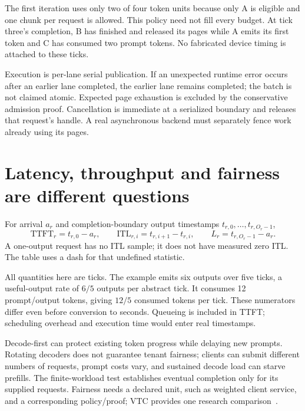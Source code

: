 \begin{center}\end{center}

The first iteration uses only two of four token units because only A is
eligible and one chunk per request is allowed. This policy need not fill
every budget. At tick three's completion, B has finished and released its
pages while A emits its first token and C has consumed two prompt tokens.
No fabricated device timing is attached to these ticks.


Execution is per-lane serial publication. If an unexpected runtime error
occurs after an earlier lane completed, the earlier lane remains completed;
the batch is not claimed atomic. Expected page exhaustion is excluded by
the conservative admission proof. Cancellation is immediate at a serialized
boundary and releases that request's handle. A real asynchronous backend
must separately fence work already using its pages.

\section{Latency, throughput and fairness are different questions}
\label{evod37:metrics}
For arrival $a_r$ and completion-boundary output timestamps
$t_{r,0},\ldots,t_{r,O_r-1}$,
\[
 \mathrm{TTFT}_r=t_{r,0}-a_r,\qquad
 \mathrm{ITL}_{r,i}=t_{r,i+1}-t_{r,i},\qquad
 L_r=t_{r,O_r-1}-a_r.
\]
A one-output request has no ITL sample; it does not have measured zero ITL.
The table uses a dash for that undefined statistic.
\begin{center}\end{center}

All quantities here are ticks. The example emits six outputs over five
ticks, a useful-output rate of $6/5$ outputs per abstract tick. It consumes
12 prompt/output tokens, giving $12/5$ consumed tokens per tick. These
numerators differ even before conversion to seconds. Queueing is included
in TTFT; scheduling overhead and execution time would enter real timestamps.

Decode-first can protect existing token progress while delaying new prompts.
Rotating decoders does not guarantee tenant fairness; clients can submit
different numbers of requests, prompt costs vary, and sustained decode load
can starve prefills. The finite-workload test establishes eventual completion
only for its supplied requests. Fairness needs a declared unit, such as
weighted client service, and a corresponding policy/proof; VTC provides
one research comparison~\cite{evod37:fairness}.

